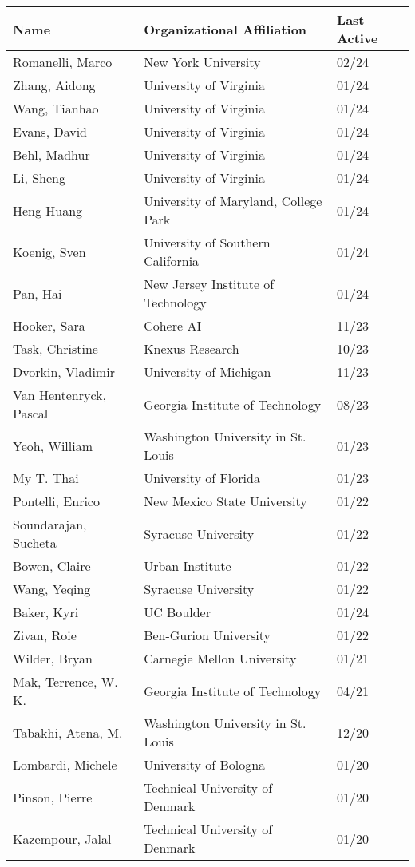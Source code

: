 \documentclass[localFont,alternative]{documentMETADATA}
\begin{document}
\centering
\begin{tabular}{lll}
\toprule
\textbf{Name} & \textbf{Organizational Affiliation} & \textbf{Last Active} \\
\midrule
		Romanelli, Marco 			 	& New York University							 		& 02/24 \\
		Zhang, Aidong						& University of Virginia						  & 01/24 \\
		Wang, Tianhao						& University of Virginia						  & 01/24 \\
		Evans, David						& University of Virginia						  & 01/24 \\
		Behl, Madhur						& University of Virginia						  & 01/24 \\
		Li, Sheng 							& University of Virginia						  & 01/24 \\
		Heng Huang 							& University of Maryland, College Park& 01/24 \\
		Koenig, Sven 						& University of Southern California 	& 01/24 \\
		Pan, Hai 								& New Jersey Institute of Technology 	& 01/24 \\
		Hooker, Sara            & Cohere AI                           & 11/23 \\
		Task, Christine					& Knexus Research										 	& 10/23 \\
		Dvorkin, Vladimir 			& University of Michigan  						& 11/23 \\
		Van Hentenryck, Pascal 	& Georgia Institute of Technology 		& 08/23 \\
		Yeoh, William 				 	& Washington University in St. Louis 	& 01/23 \\
		My T. Thai              & University of Florida								& 01/23 \\
		Pontelli, Enrico 			 	& New Mexico State University 				& 01/22 \\
		Soundarajan, Sucheta 		& Syracuse University 								& 01/22 \\
		Bowen, Claire 					& Urban Institute 										& 01/22 \\
		Wang, Yeqing 						& Syracuse University 								& 01/22 \\
		Baker, Kyri 						& UC Boulder 													& 01/24 \\
		Zivan, Roie 					  & Ben-Gurion University 							& 01/22 \\
		Wilder, Bryan 					& Carnegie Mellon University 					& 01/21 \\
		Mak, Terrence, W. K. 		& Georgia Institute of Technology 		& 04/21 \\
		Tabakhi, Atena, M. 			& Washington University in St. Louis  & 12/20 \\
		Lombardi, Michele 			& University of Bologna 							& 01/20 \\
		Pinson, Pierre 					& Technical University of Denmark 		& 01/20 \\
		Kazempour, Jalal 				& Technical University of Denmark 		& 01/20 \\
\bottomrule
\end{tabular}
\end{document}
